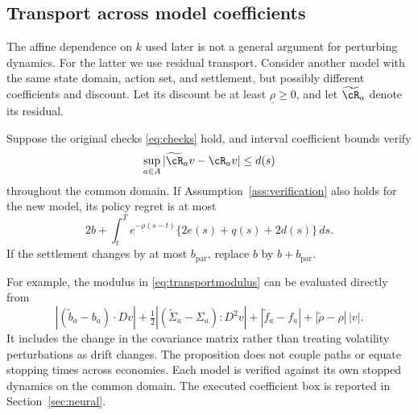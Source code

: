 \subsection{Transport across model coefficients}
The affine dependence on $k$ used later is not a general argument for perturbing dynamics. For the latter we use residual transport. Consider another model with the same state domain, action set, and settlement, but possibly different coefficients and discount. Let its discount be at least $\underline\rho\geq0$, and let $\widetilde\cR_a$ denote its residual.

\begin{proposition}\label{prop:transport}
Suppose the original checks \eqref{eq:checks} hold, and interval coefficient bounds verify
\begin{equation}
 \sup_{a\in A}|\widetilde\cR_a v-\cR_a v|\leq d(s)
 \label{eq:transportmodulus}
\end{equation}
throughout the common domain. If Assumption~\ref{ass:verification} also holds for the new model, its policy regret is at most
\begin{equation}
 2b+\int_t^T e^{-\underline\rho(s-t)}\{2e(s)+q(s)+2d(s)\}\,ds.
 \label{eq:transportbound}
\end{equation}
If the settlement changes by at most $b_\mathrm{par}$, replace $b$ by $b+b_\mathrm{par}$.
\end{proposition}

For example, the modulus in \eqref{eq:transportmodulus} can be evaluated directly from
\[
 |(\widetilde b_a-b_a)\cdot Dv|
 +\tfrac12|(\widetilde\Sigma_a-\Sigma_a):D^2v|
 +|\widetilde f_a-f_a|+|\widetilde\rho-\rho|\,|v|.
\]
It includes the change in the covariance matrix rather than treating volatility perturbations as drift changes. The proposition does not couple paths or equate stopping times across economies. Each model is verified against its own stopped dynamics on the common domain. The executed coefficient box is reported in Section~\ref{sec:neural}.

